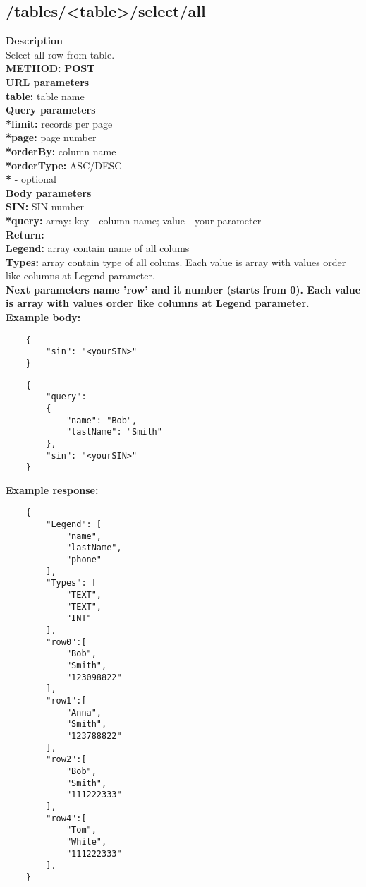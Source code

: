 \documentclass[a4paper, 12pt]{report}
\begin{document}
\subsection{/tables/<table>/select/all}
\textbf{\color{redText} Description} \\
Select all row from table. \\
\textbf{\color{redText} METHOD: } \textbf{POST} \\
\textbf{\color{redText} URL parameters} \\
\textbf{table: } table name\\
\textbf{\color{redText} Query parameters} \\
\textbf{*limit: } records per page \\
\textbf{*page: } page number \\
\textbf{*orderBy: } column name \\
\textbf{*orderType: } ASC/DESC \\
\textbf{*} - optional \\
\textbf{\color{redText} Body parameters} \\
\textbf{SIN: } SIN number\\
\textbf{*query: } array: key - column name; value - your parameter \\
\textbf{\color{redText} Return: } \\
\textbf{Legend: } array contain name of all colums \\
\textbf{Types: } array contain type of all colums. Each value is array with values order like columns at Legend parameter. \\
\textbf{Next parameters name 'row' and it number (starts from 0). Each value is array with values order like columns at Legend parameter.}\\
\textbf{\color{redText} Example body: }
\begin{lstlisting}
    {
        "sin": "<yourSIN>"
    }
\end{lstlisting}
\begin{lstlisting}
    {
        "query":
        {
            "name": "Bob",
            "lastName": "Smith"
        },
        "sin": "<yourSIN>"
    }
\end{lstlisting}
\textbf{\color{redText} Example response: }
\begin{lstlisting}
    {
        "Legend": [
            "name",
            "lastName",
            "phone"
        ],
        "Types": [
            "TEXT",
            "TEXT",
            "INT"
        ],
        "row0":[
            "Bob",
            "Smith",
            "123098822"
        ],
        "row1":[
            "Anna",
            "Smith",
            "123788822"
        ],
        "row2":[
            "Bob",
            "Smith",
            "111222333"
        ],
        "row4":[
            "Tom",
            "White",
            "111222333"
        ],
    }
\end{lstlisting}
\end{document}
